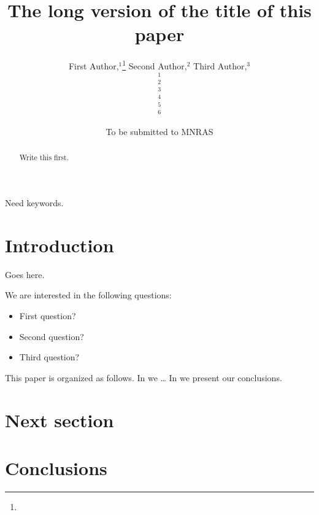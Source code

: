 \documentclass[useAMS,usenatbib]{mn2e}
\title[Short title]
{The long version of the title of this paper}
\author[All of us]{%
  First Author,$^{1}$\thanks{\email}
  Second Author,$^{2}$
  Third Author,$^{3}$
\newauthor{%
  Fourth Author,$^{4}$
  Fifth Author,$^{5}$
  Sixth Author.$^{6}$}
  \medskip\\
  $^1$\firstplace\\
  $^2$\secondplace\\
  $^3$\thirdplace\\
  $^4$\fourthplace\\
  $^5$\fifthplace\\
  $^6$\sixthplace\\
}
\begin{document}
             
\date{To be submitted to MNRAS}
             
\pagerange{\pageref{firstpage}--\pageref{lastpage}}

\maketitle

\label{firstpage}


\begin{abstract}
Write this first.
\end{abstract}

\begin{keywords}
  Need keywords.
\end{keywords}


\section{Introduction}

Goes here.

We are interested in the following questions:

\begin{itemize}

\item First question?

\item Second question? 

\item Third question? 

\end{itemize}

This paper is organized as follows. In  we \ldots
In  we present our conclusions.



\section{Next section}
\label{sec:next}



\section{Conclusions}
\label{sec:conclude}
\end{document}
